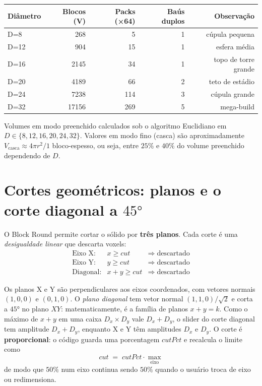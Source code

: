 \documentclass[12pt,a4paper]{scrartcl}
\newcommand{\acc}[1]{\textcolor{accent}{\textbf{#1}}}
\begin{document}
\vspace{0.5em}
\begin{center}
\begin{tabular}{@{}lrrrr@{}}
\toprule
\textbf{Diâmetro} & \textbf{Blocos (V)} & \textbf{Packs (×64)} & \textbf{Baús duplos} & \textbf{Observação} \\
\midrule
D=8   &   268 &  5  & 1 & cúpula pequena  \\
D=12  &   904 & 15  & 1 & esfera média \\
D=16  &  2145 & 34  & 1 & topo de torre grande \\
D=20  &  4189 & 66  & 2 & teto de estádio \\
D=24  &  7238 & 114 & 3 & cúpula grande \\
D=32  & 17156 & 269 & 5 & mega-build \\
\bottomrule
\end{tabular}
\end{center}

Volumes em modo preenchido calculados sob o algoritmo Euclidiano em $D \in \{8,12,16,20,24,32\}$. Valores em modo fino (casca) são aproximadamente $V_{\mathrm{casca}} \approx 4\pi r^2 / 1$ bloco-espesso, ou seja, entre $25\%$ e $40\%$ do volume preenchido dependendo de $D$.

\section{Cortes geométricos: planos e o corte diagonal a $45°$}

O Block Round permite cortar o sólido por \acc{três planos}. Cada corte é uma \emph{desigualdade linear} que descarta voxels:
\[
\begin{array}{lcl}
\text{Eixo X:}    & x \geq \mathit{cut}      & \Rightarrow\; \text{descartado} \\
\text{Eixo Y:}    & y \geq \mathit{cut}      & \Rightarrow\; \text{descartado} \\
\text{Diagonal:}  & x + y \geq \mathit{cut}  & \Rightarrow\; \text{descartado}
\end{array}
\]

Os planos X e Y são perpendiculares aos eixos coordenados, com vetores normais $(1,0,0)$ e $(0,1,0)$. O \emph{plano diagonal} tem vetor normal $(1,1,0)/\sqrt{2}$ e corta a $45°$ no plano $XY$: matematicamente, é a família de planos $x+y = k$. Como o máximo de $x+y$ em uma caixa $D_x \times D_y$ vale $D_x + D_y$, o slider do corte diagonal tem amplitude $D_x + D_y$, enquanto X e Y têm amplitudes $D_x$ e $D_y$. O corte é \acc{proporcional}: o código guarda uma porcentagem $\mathit{cutPct}$ e recalcula o limite como
\[
\mathit{cut} \;=\; \mathit{cutPct} \cdot \max_{\text{eixo}}
\]
de modo que $50\%$ num eixo continua sendo $50\%$ quando o usuário troca de eixo ou redimensiona.
\end{document}
